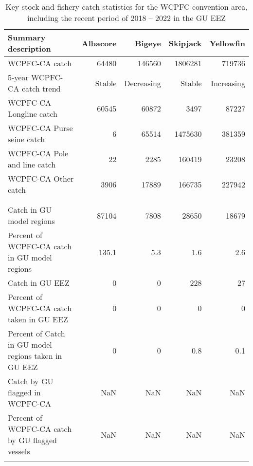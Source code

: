 \begin{longtable}{lrrrr}
\caption{Key stock and fishery catch statistics for the WCPFC convention area, including the recent period of 2018 -- 2022 in the GU EEZ} \\ 
  \hline
Summary description & Albacore & Bigeye & Skipjack & Yellowfin \\ 
  \hline
WCPFC-CA catch & 64480 & 146560 & 1806281 & 719736 \\ 
  5-year WCPFC-CA catch trend & Stable & Decreasing & Stable & Increasing \\ 
  WCPFC-CA Longline catch & 60545 & 60872 & 3497 & 87227 \\ 
  WCPFC-CA Purse seine catch & 6 & 65514 & 1475630 & 381359 \\ 
  WCPFC-CA Pole and line catch & 22 & 2285 & 160419 & 23208 \\ 
  WCPFC-CA Other catch & 3906 & 17889 & 166735 & 227942 \\ 
   &  &  &  &  \\ 
   &  &  &  &  \\ 
   \hline
Catch in GU model regions & 87104 & 7808 & 28650 & 18679 \\ 
  Percent of WCPFC-CA catch in GU model regions & 135.1 & 5.3 & 1.6 & 2.6 \\ 
  Catch in GU EEZ & 0 & 0 & 228 & 27 \\ 
  Percent of WCPFC-CA catch taken in GU EEZ & 0 & 0 & 0 & 0 \\ 
  Percent of Catch in GU model regions taken in GU EEZ & 0 & 0 & 0.8 & 0.1 \\ 
  Catch by GU flagged in WCPFC-CA & NaN & NaN & NaN & NaN \\ 
  Percent of WCPFC-CA catch by GU flagged vessels & NaN & NaN & NaN & NaN \\ 
  \hline
\label{cat_sum_tab}
\end{longtable}
